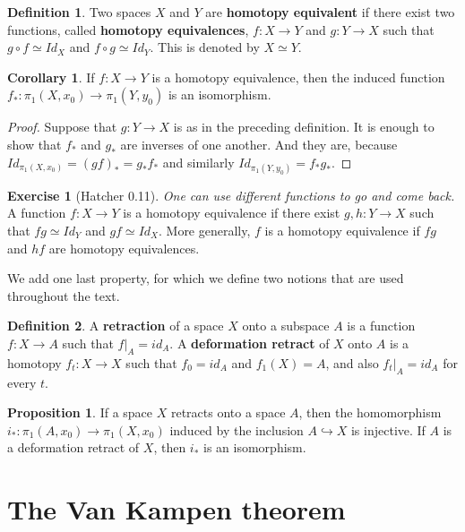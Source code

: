 \documentclass{book}
\theoremstyle{definition}
\newtheorem*{defn}{Definition}
\newtheorem*{prop}{Proposition}
\newtheorem*{coro}{Corollary}
\newtheorem*{ejer}{Exercise}
\begin{document}
\begin{defn}
Two spaces $X$ and $Y$ are \textbf{homotopy equivalent} if
there exist two functions, called \textbf{homotopy
equivalences}, $f:X\to Y$ and $g:Y\to X$ such that
$g\circ f\simeq Id_X$ and $f\circ g\simeq Id_Y$. This is
denoted by $X\simeq Y$.
\end{defn}

\begin{coro}\label{1.2.1}
If $f:X\to Y$ is a homotopy equivalence, then the induced
function $f_*:\pi_1(X,x_0)\to\pi_1(Y,y_0)$ is an
isomorphism.
\end{coro}

\begin{proof}
Suppose that $g:Y\to X$ is as in the preceding definition.
It is enough to show that $f_*$ and $g_*$ are inverses of one
another. And they are, because
$Id_{\pi_1(X,x_0)}=(g f)_*=g_*f_*$ and similarly
$Id_{\pi_1(Y,y_0)}=f_*g_*$.
\end{proof}

\begin{ejer}[Hatcher 0.11]\label{hatcher:0.11}
\textit{One can use different functions to go and come
back.} A function $f:X\to Y$ is a homotopy equivalence if
there exist $g,h:Y\to X$ such that $fg\simeq Id_Y$ and
$gf\simeq Id_X$. More generally, $f$ is a homotopy
equivalence if $fg$ and $hf$ are homotopy equivalences.
\end{ejer}

We add one last property, for which we define two notions
that are used throughout the text.

\begin{defn}\label{def:retracto}
A \textbf{retraction} of a space $X$ onto a subspace $A$ is a
function $f:X\to A$ such that $f|_A=id_A$. A
\textbf{deformation retract} of $X$ onto $A$ is a homotopy
$f_t:X\to X$ such that $f_0=id_A$ and $f_1(X)=A$, and also
$f_t|_A=id_A$ for every $t$.
\end{defn}

\begin{prop}
If a space $X$ retracts onto a space $A$, then the
homomorphism $i_*:\pi_1(A,x_0)\to\pi_1(X,x_0)$ induced by
the inclusion $A\hookrightarrow X$ is injective. If $A$ is a
deformation retract of $X$, then $i_*$ is an isomorphism.
\end{prop}

\chapter{The Van Kampen theorem}
\end{document}
